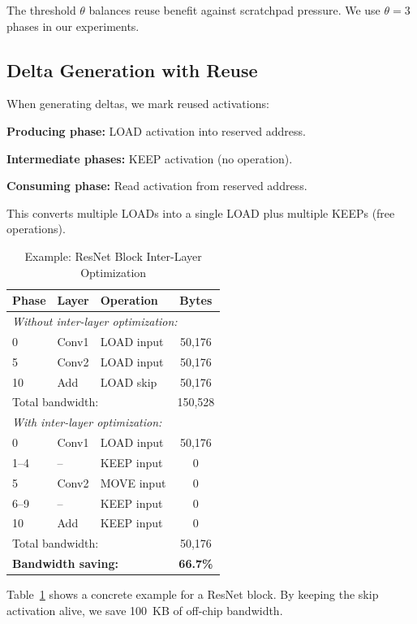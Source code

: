 \documentclass[journal]{IEEEtran}
\begin{document}
The threshold $\theta$ balances reuse benefit against scratchpad pressure. We use $\theta = 3$ phases in our experiments.

\subsection{Delta Generation with Reuse}

When generating deltas, we mark reused activations:

\textbf{Producing phase:} LOAD activation into reserved address.

\textbf{Intermediate phases:} KEEP activation (no operation).

\textbf{Consuming phase:} Read activation from reserved address.

This converts multiple LOADs into a single LOAD plus multiple KEEPs (free operations).

\begin{table}[t]
\centering
\caption{Example: ResNet Block Inter-Layer Optimization}
\label{tab:resnet_example}
\small
\begin{tabular}{lllc}
\toprule
\textbf{Phase} & \textbf{Layer} & \textbf{Operation} & \textbf{Bytes} \\
\midrule
\multicolumn{4}{l}{\textit{Without inter-layer optimization:}} \\
0 & Conv1 & LOAD input & 50,176 \\
5 & Conv2 & LOAD input & 50,176 \\
10 & Add & LOAD skip & 50,176 \\
\midrule
\multicolumn{3}{l}{Total bandwidth:} & 150,528 \\
\midrule
\multicolumn{4}{l}{\textit{With inter-layer optimization:}} \\
0 & Conv1 & LOAD input & 50,176 \\
1--4 & -- & KEEP input & 0 \\
5 & Conv2 & MOVE input & 0 \\
6--9 & -- & KEEP input & 0 \\
10 & Add & KEEP input & 0 \\
\midrule
\multicolumn{3}{l}{Total bandwidth:} & 50,176 \\
\midrule
\multicolumn{3}{l}{\textbf{Bandwidth saving:}} & \textbf{66.7\%} \\
\bottomrule
\end{tabular}
\end{table}

Table~\ref{tab:resnet_example} shows a concrete example for a ResNet block. By keeping the skip activation alive, we save 100~KB of off-chip bandwidth.
\end{document}
